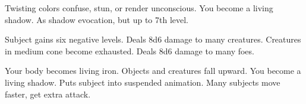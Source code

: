 \begin{swspelllist}
   Twisting colors confuse, stun, or render unconscious.
   You become a living shadow.
   As shadow evocation, but up to 7th level.

   Subject gains six negative levels.
   Deals 8d6 damage to many creatures.
   Creatures in medium cone become exhausted.
   Deals 8d6 damage to many foes.

   Your body becomes living iron.
   Objects and creatures fall upward.
   You become a living shadow.
  \M Puts subject into suspended animation.
   Many subjects move faster, get extra attack.
\end{swspelllist}

